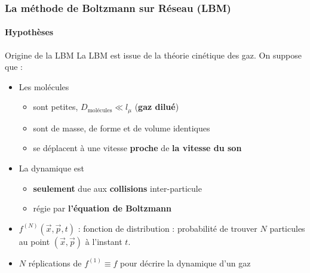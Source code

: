 \documentclass[12pt, xcolor=svgnames]{beamer}
\newcommand{\bwarrow}{\item[\color{DarkRed} \ding{227}]}
\newcommand{\warrow}{\item[\color{blue!50!black!70} \tiny{\ding{109}}]}
\newcommand{\bepar}[1]{
	\left( #1 \right)  
}
\begin{document}
\begin{frame}
\frametitle{La méthode de Boltzmann sur Réseau (LBM)}
\framesubtitle{Hypothèses}
\begin{block}{Origine de la LBM}
La LBM est issue de la théorie cinétique des gaz. On suppose que :
\begin{itemize}
\bwarrow Les molécules 
		\begin{itemize}
			\warrow sont petites, $D_{\text{molécules}} \ll l_\mu$ (\textbf{gaz dilué})
			\warrow sont de masse, de forme et de volume identiques
			\warrow se déplacent à une vitesse \textbf{proche} de \textbf{la vitesse du son} \\
		\end{itemize}
\bwarrow La dynamique est 
		\begin{itemize}
			\warrow \textbf{seulement} due aux \textbf{collisions} inter-particule
			\warrow régie par \textbf{l'équation de Boltzmann}
		\end{itemize}
\end{itemize}
\end{block}
\pause
\begin{itemize}
	\bwarrow $f^{(N)}\bepar{\vec{x}, \vec{p}, t}$ : fonction de distribution : probabilité de trouver $N$ particules au point $\bepar{\vec{x}, \vec{p}}$ à l'instant $t$.
	\bwarrow $N$ réplications de $f^{(1)} \equiv f$ pour décrire la dynamique d'un gaz
\end{itemize}
\end{frame}

%
\end{document}
